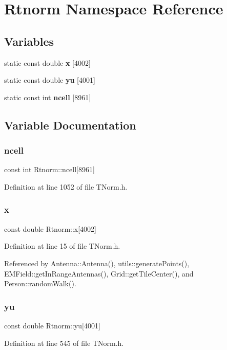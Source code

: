 \section{Rtnorm Namespace Reference}
\label{namespace_rtnorm}
\subsection*{Variables}
\begin{DoxyCompactItemize}
\item 
static const double \textbf{ x} [4002]
\item 
static const double \textbf{ yu} [4001]
\item 
static const int \textbf{ ncell} [8961]
\end{DoxyCompactItemize}


\subsection{Variable Documentation}
\mbox{\label{namespace_rtnorm_a1ab729acd3e8c1cdcc4d46e8d5fbeabe}} 
\subsubsection{ncell}
{\footnotesize\ttfamily const int Rtnorm\+::ncell[8961]\hspace{0.3cm}{\ttfamily [static]}}



Definition at line 1052 of file T\+Norm.\+h.

\mbox{\label{namespace_rtnorm_ab3c44df945a22123e3f6d0817c7ee986}} 
\subsubsection{x}
{\footnotesize\ttfamily const double Rtnorm\+::x[4002]\hspace{0.3cm}{\ttfamily [static]}}



Definition at line 15 of file T\+Norm.\+h.



Referenced by Antenna\+::\+Antenna(), utils\+::generate\+Points(), E\+M\+Field\+::get\+In\+Range\+Antennas(), Grid\+::get\+Tile\+Center(), and Person\+::random\+Walk().

\mbox{\label{namespace_rtnorm_aebdc65d692acb962696e3803ac2bf231}} 
\subsubsection{yu}
{\footnotesize\ttfamily const double Rtnorm\+::yu[4001]\hspace{0.3cm}{\ttfamily [static]}}



Definition at line 545 of file T\+Norm.\+h.

